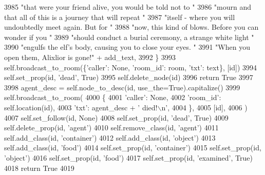 \begin{DoxyCode}
3985                 \textcolor{stringliteral}{"that were your friend alive, you would be told not to "}
3986                 \textcolor{stringliteral}{"mourn and that all of this is a journey that will repeat "}
3987                 \textcolor{stringliteral}{"itself - where you will undoubtedly meet again. But for "}
3988                 \textcolor{stringliteral}{"now, this kind of blows. Before you can wonder if you "}
3989                 \textcolor{stringliteral}{"should conduct a burial ceremony, a strange white light "}
3990                 \textcolor{stringliteral}{"engulfs the elf's body, causing you to close your eyes. "}
3991                 \textcolor{stringliteral}{"When you open them, Alixlior is gone!"} + add\_text,
3992             \}
3993             self.broadcast\_to\_room(\{\textcolor{stringliteral}{'caller'}: \textcolor{keywordtype}{None}, \textcolor{stringliteral}{'room\_id'}: room, \textcolor{stringliteral}{'txt'}: text\}, [id])
3994             self.set\_prop(id, \textcolor{stringliteral}{'dead'}, \textcolor{keyword}{True})
3995             self.delete\_node(id)
3996             \textcolor{keywordflow}{return} \textcolor{keyword}{True}
3997 
3998         agent\_desc = self.node\_to\_desc(id, use\_the=\textcolor{keyword}{True}).capitalize()
3999         self.broadcast\_to\_room(
4000             \{
4001                 \textcolor{stringliteral}{'caller'}: \textcolor{keywordtype}{None},
4002                 \textcolor{stringliteral}{'room\_id'}: self.location(id),
4003                 \textcolor{stringliteral}{'txt'}: agent\_desc + \textcolor{stringliteral}{' died!\(\backslash\)n'},
4004             \},
4005             [id],
4006         )
4007         self.set\_follow(id, \textcolor{keywordtype}{None})
4008         self.set\_prop(id, \textcolor{stringliteral}{'dead'}, \textcolor{keyword}{True})
4009         self.delete\_prop(id, \textcolor{stringliteral}{'agent'})
4010         self.remove\_class(id, \textcolor{stringliteral}{'agent'})
4011         self.add\_class(id, \textcolor{stringliteral}{'container'})
4012         self.add\_class(id, \textcolor{stringliteral}{'object'})
4013         self.add\_class(id, \textcolor{stringliteral}{'food'})
4014         self.set\_prop(id, \textcolor{stringliteral}{'container'})
4015         self.set\_prop(id, \textcolor{stringliteral}{'object'})
4016         self.set\_prop(id, \textcolor{stringliteral}{'food'})
4017         self.set\_prop(id, \textcolor{stringliteral}{'examined'}, \textcolor{keyword}{True})
4018         \textcolor{keywordflow}{return} \textcolor{keyword}{True}
4019 
\end{DoxyCode}
\mbox{\label{classlight__chats_1_1graph_1_1Graph_a32111f6e4bae319c37f6d8de8dd2bbbe}} 
